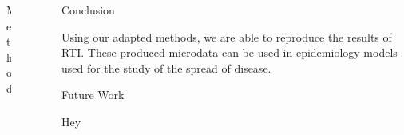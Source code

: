 \documentclass[final]{beamer}
\newlength{\sepwid}
\newlength{\onecolwid}
\newlength{\twocolwid}
\begin{document}
\begin{frame}[t]
\begin{columns}[t]
\begin{column}{\twocolwid}
\begin{columns}[t,totalwidth=\twocolwid]
\begin{column}{\onecolwid}
\begin{block}{Method}
\begin{enumerate}
\end{enumerate}

\end{block}


\end{column} %

\begin{column}{\onecolwid} %

\end{column} %

\end{columns} %

\end{column} %


\begin{column}{\sepwid}\end{column} %

\begin{column}{\onecolwid} %


\begin{block}{Conclusion}

Using our adapted methods, we are able to reproduce the results of RTI.  These produced microdata can be used in epidemiology models used for the study of the spread of disease.

\end{block}


\begin{block}{Future Work}

Hey

\end{block}


\end{column}
\end{columns}
\end{frame}
\end{document}
